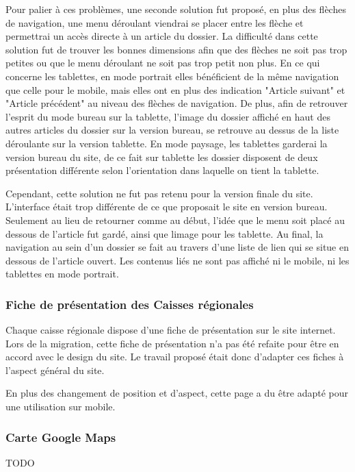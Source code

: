 \documentclass[12pt,a4paper]{article}
\begin{document}
Pour palier à ces problèmes, une seconde solution fut proposé, en plus des flèches de navigation, une menu déroulant viendrai se placer entre les flèche et permettrai un accès directe à un article du dossier. La difficulté dans cette solution fut de trouver les bonnes dimensions afin que des flèches ne soit pas trop petites ou que le menu déroulant ne soit pas trop petit non plus. En ce qui concerne les tablettes, en mode portrait elles bénéficient de la même navigation que celle pour le mobile, mais elles ont en plus des indication "Article suivant" et "Article précédent" au niveau des flèches de navigation. De plus, afin de retrouver l'esprit du mode bureau sur la tablette, l'image du dossier affiché en haut des autres articles du dossier sur la version bureau, se retrouve au dessus de la liste déroulante sur la version tablette. En mode paysage, les tablettes garderai la version bureau du site, de ce fait sur tablette les dossier disposent de deux présentation différente selon l'orientation dans laquelle on tient la tablette.\par
Cependant, cette solution ne fut pas retenu pour la version finale du site. L'interface était trop différente de ce que proposait le site en version bureau. Seulement au lieu de retourner comme au début, l'idée que le menu soit placé au dessous de l'article fut gardé, ainsi que limage pour les tablette. Au final, la navigation au sein d'un dossier se fait au travers d'une liste de lien qui se situe en dessous de l'article ouvert. Les contenus liés ne sont pas affiché ni le mobile, ni les tablettes en mode portrait.\par

\subsubsection{Fiche de présentation des Caisses régionales}
Chaque caisse régionale dispose d'une fiche de présentation sur le site internet. Lors de la migration, cette fiche de présentation n'a pas été refaite pour être en accord avec le design du site. Le travail proposé était donc d'adapter ces fiches à l'aspect général du site.\par 
En plus des changement de position et d'aspect, cette page a du être adapté pour une utilisation sur mobile. 

\subsubsection{Carte Google Maps}
TODO
\end{document}
